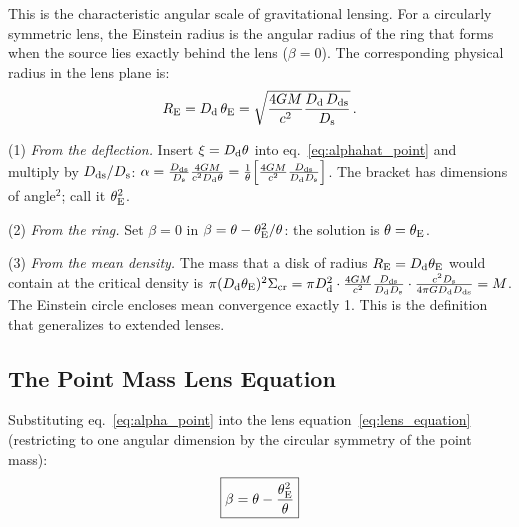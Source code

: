 This is the characteristic angular scale of gravitational
lensing.  For a circularly symmetric lens, the Einstein radius is the
angular radius of the ring that forms when the source lies exactly
behind the lens ($\beta = 0$).  The corresponding physical radius in the
lens plane is:
\begin{equation}
    R_{\mathrm{E}} = D_{\mathrm{d}}\, \theta_{\mathrm{E}}
    = \sqrt{\frac{4G M}{c^2}
    \frac{D_{\mathrm{d}}\, D_{\mathrm{ds}}}{D_{\mathrm{s}}}} \,.
    \label{eq:einstein_radius_physical}
\end{equation}
\begin{derivation}
(1) \emph{From the deflection.} Insert $\xi = D_{\mathrm{d}}\theta$ into
eq.~\eqref{eq:alphahat_point} and multiply by $D_{\mathrm{ds}}/D_{\mathrm{s}}$:
$\alpha = \frac{D_{\mathrm{ds}}}{D_{\mathrm{s}}}\frac{4G M}{c^2D_{\mathrm{d}}\theta}
= \frac{1}{\theta}\Big[\frac{4G M}{c^2}\frac{D_{\mathrm{ds}}}{D_{\mathrm{d}}D_{\mathrm{s}}}\Big]$.
The bracket has dimensions of angle$^2$; call it $\theta_{\mathrm{E}}^2$.

(2) \emph{From the ring.} Set $\beta = 0$ in
$\beta = \theta - \theta_{\mathrm{E}}^2/\theta$: the solution is $\theta = \theta_{\mathrm{E}}$.

(3) \emph{From the mean density.} The mass that a disk of radius
$R_{\mathrm{E}} = D_{\mathrm{d}}\theta_{\mathrm{E}}$ would contain at the critical density is
$\pi(D_{\mathrm{d}}\theta_{\mathrm{E}})^2\Sigma_{\mathrm{cr}}
= \pi D_{\mathrm{d}}^2\cdot\frac{4G M}{c^2}\frac{D_{\mathrm{ds}}}{D_{\mathrm{d}}D_{\mathrm{s}}}
\cdot\frac{c^2D_{\mathrm{s}}}{4\pi GD_{\mathrm{d}}D_{\mathrm{ds}}} = M$.
The Einstein circle encloses mean convergence exactly 1. This is the
definition that generalizes to extended lenses.
\end{derivation}

\subsection{The Point Mass Lens Equation}

Substituting eq.~\eqref{eq:alpha_point} into the lens
equation~\eqref{eq:lens_equation} (restricting to one angular dimension
by the circular symmetry of the point mass):
\begin{equation}
    \boxed{
    \beta = \theta - \frac{\theta_{\mathrm{E}}^2}{\theta}
    }
    \label{eq:point_mass_lens_eq}
\end{equation}

